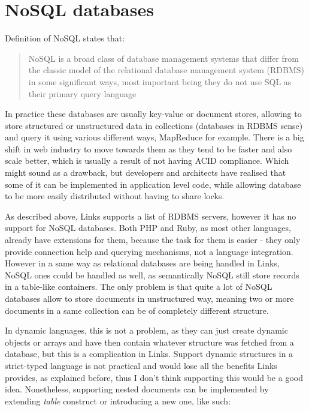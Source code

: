 \section{NoSQL databases}

Definition of NoSQL states that:

\begin{quote}
NoSQL is a broad class of database management systems that differ from the classic model of the relational database management system (RDBMS) in some significant ways, most important being they do not use SQL as their primary query language
\end{quote}

In practice these databases are usually key-value or document stores, allowing to store structured or unstructured data in collections (databases in RDBMS sense) and query it using various different ways, MapReduce for example. There is a big shift in web industry to move towards them as they tend to be faster and also scale better, which is usually a result of not having ACID\citep{acid} compliance. Which might sound as a drawback, but developers and architects have realised that some of it can be implemented in application level code, while allowing database to be more easily distributed without having to share locks. 

As described above, Links supports a list of RDBMS servers, however it has no support for NoSQL databases. Both PHP and Ruby, as most other languages, already have extensions for them, because the task for them is easier - they only provide connection help and querying mechanisms, not a language integration. However in a same way as relational databases are being handled in Links, NoSQL ones could be handled as well, as semantically NoSQL still store records in a table-like containers. The only problem is that quite a lot of NoSQL databases allow to store documents in unstructured way, meaning two or more documents in a same collection can be of completely different structure. 

In dynamic languages, this is not a problem, as they can just create dynamic objects or arrays and have then contain whatever structure was fetched from a database, but this is a complication in Links. Support dynamic structures in a strict-typed language is not practical and would lose all the benefits Links provides, as explained before, thus I don't think supporting this would be a good idea. Nonetheless, supporting nested documents can be implemented by extending \textit{table} construct or introducing a new one, like such:

